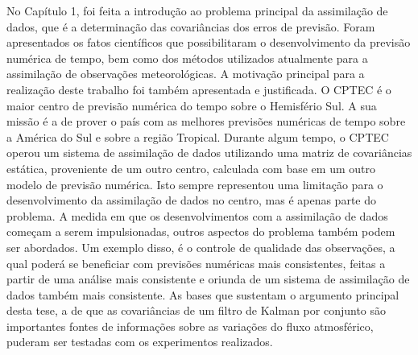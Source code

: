 No Capítulo 1, foi feita a introdução ao problema principal da assimilação de dados, que é a determinação das covariâncias dos erros de previsão. Foram apresentados os fatos científicos que possibilitaram o desenvolvimento da previsão numérica de tempo, bem como dos métodos utilizados atualmente para a assimilação de observações meteorológicas. A motivação principal para a realização deste trabalho foi também apresentada e justificada. O CPTEC é o maior centro de previsão numérica do tempo sobre o Hemisfério Sul. A sua missão é a de prover o país com as melhores previsões numéricas de tempo sobre a América do Sul e sobre a região Tropical. Durante algum tempo, o CPTEC operou um sistema de assimilação de dados utilizando uma matriz de covariâncias estática, proveniente de um outro centro, calculada com base em um outro modelo de previsão numérica. Isto sempre representou uma limitação para o desenvolvimento da assimilação de dados no centro, mas é apenas parte do problema. A medida em que os desenvolvimentos com a assimilação de dados começam a serem impulsionadas, outros aspectos do problema também podem ser abordados. Um exemplo disso, é o controle de qualidade das observações, a qual poderá se beneficiar com previsões numéricas mais consistentes, feitas a partir de uma análise mais consistente e oriunda de um sistema de assimilação de dados também mais consistente. As bases que sustentam o argumento principal desta tese, a de que as covariâncias de um filtro de Kalman por conjunto são importantes fontes de informações sobre as variações do fluxo atmosférico, puderam ser testadas com os experimentos realizados.

